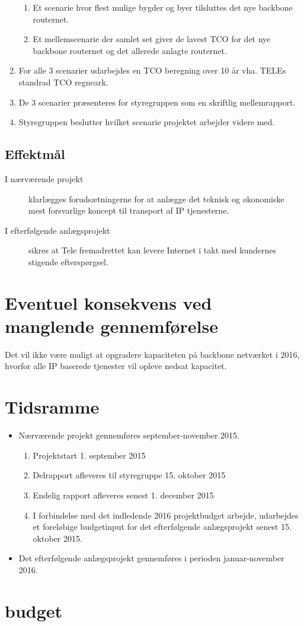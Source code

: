 \documentclass[11pt,a4paper]{article}
\begin{document}
\begin{enumerate}
\begin{enumerate}
\item Et scenarie hvor flest mulige bygder og byer tilsluttes det nye backbone routernet.
\item Et mellemscenarie der samlet set giver de lavest TCO for det nye backbone routernet og det allerede anlagte routernet.
\end{enumerate}
\item For alle 3 scenarier udarbejdes en TCO beregning over 10 år vha. TELEs standrad TCO regneark.
\item De 3 scenarier præsenteres for styregruppen som en skriftlig mellemrapport.
\item Styregruppen beslutter hvilket scenarie projektet arbejder videre med.
\end{enumerate}
\subsection{Effektmål}
\begin{description}
\item [I nærværende projekt ]klarlægges forudsætningerne for at anlægge det teknisk og økonomiske mest forsvarlige koncept til transport af IP tjenesterne.
\item [I efterfølgende anlægsprojekt] sikres at Tele fremadrettet kan levere Internet i takt med kundernes stigende efterspørgsel.
\end{description}
\section{Eventuel konsekvens ved manglende gennemførelse}
Det vil ikke være muligt at opgradere kapaciteten på backbone netværket i 2016, hvorfor alle IP baserede tjenester vil opleve nedsat kapacitet.
\section{Tidsramme}
\begin{itemize}
\item Nærværende projekt gennemføres september-november 2015.
\begin{enumerate}
\item Projektstart 1. september 2015
\item Delrapport afleveres til styregruppe 15. oktober 2015
\item Endelig rapport afleveres senest 1. december 2015
\item I forbindelse med det indledende 2016 projektbudget arbejde, udarbejdes et foreløbige budgetinput for det efterfølgende anlægsprojekt senest 15. oktober 2015.
\end{enumerate}
\item Det efterfølgende anlægsprojekt gennemføres i perioden januar-november 2016.
\end{itemize}
\section{budget}

%
%


\end{document}
